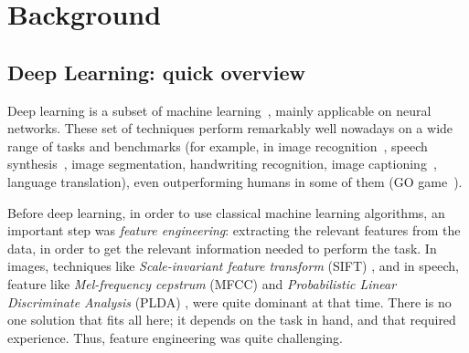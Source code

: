 \clearpage

\section{Background}\label{sec:gbem_background}
\subsection{Deep Learning: quick overview}

\par Deep learning is a subset of machine learning~\citep{lecun2015deep,Goodfellow-et-al-2016}, mainly applicable on neural networks. These set of techniques perform remarkably well nowadays on a wide range of tasks and benchmarks (for example, in image recognition~\citep{krizhevsky2012imagenet,simonyan2014very,he2016deep}, speech synthesis~\citep{oord2016wavenet}, image segmentation, handwriting recognition, image captioning~\citep{DBLP:journals/corr/VinyalsTBE14,karpathy2015deep}, language translation\citep{sutskever2014sequence}), even outperforming humans in some of them (GO game~\citep{silver2016mastering}).



\par Before deep learning, in order to use classical machine learning algorithms, an important step was \textit{feature engineering}: extracting the relevant features from the data, in order to get the relevant information needed to perform the task. In images, techniques like \textit{Scale-invariant feature transform} (SIFT) \citep{lowe1999object}, and in speech, feature like \textit{Mel-frequency cepstrum} (MFCC) and \textit{Probabilistic  Linear  Discriminate  Analysis} (PLDA) \citep{narang2015speech}, were quite dominant at that time. There is no one solution that fits all here; it depends on the task in hand, and that required experience. Thus, feature engineering was quite challenging.

